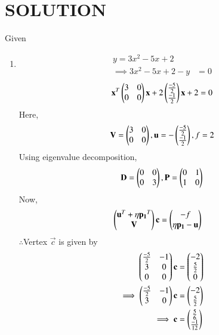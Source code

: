 \documentclass[journal,12pt,twocolumn]{IEEEtran}
\begin{document}
\section{SOLUTION}  
Given
\begin{enumerate}
\item
    \begin{align}
        y = 3x^2-5x+2\\
        \implies 3x^2-5x+2-y &=0
    \end{align}
    \begin{align}
    \mathbf{x}^T \begin{pmatrix}3 & 0\\0 & 0\end{pmatrix}\mathbf{x}+ 2\begin{pmatrix}\frac{-5}{2} \\ \frac{-1}{2}\end{pmatrix}\mathbf{x}+2=0
\end{align}
    Here,
    \begin{align}
        \mathbf{V} = \begin{pmatrix}3 & 0 \\ 0 & 0\end{pmatrix},\mathbf{u}=-\begin{pmatrix}\frac{-5}{2} \\ \frac{-1}{2}\end{pmatrix},f=2
    \end{align}
     Using eigenvalue decomposition,
    \begin{align}
        \mathbf{D} = \begin{pmatrix}0 & 0\\0 & 3\end{pmatrix} ,\mathbf{P}=\begin{pmatrix}0 & 1\\1 & 0\end{pmatrix}
    \end{align}
Now,
\begin{align}
    \begin{pmatrix}\mathbf{u}^T + \eta\mathbf{p_1}^T \\ \mathbf{V}\end{pmatrix}\mathbf{c} &= \begin{pmatrix}-f \\ \eta\mathbf{p_1}-\mathbf{u}\end{pmatrix} 
\end{align}
    $\therefore$Vertex $\vec{c}$ is given by
    \begin{align}
        \begin{pmatrix}\frac{-5}{2} & -1 \\ 3 & 0 \\ 0 & 0\end{pmatrix}\mathbf{c} &= \begin{pmatrix}-2 \\ \frac{5}{2} \\ 0\end{pmatrix} \\
     \implies  \begin{pmatrix}\frac{-5}{2} & -1 \\ 3 & 0\end{pmatrix}\mathbf{c} &= \begin{pmatrix}-2 \\ \frac{5}{2}\end{pmatrix}
        \\
        \implies \mathbf{c} &= \begin{pmatrix}\frac{5}{6}\\\frac{-1}{12}\end{pmatrix}
    \end{align}
    

\end{enumerate}
\end{document}
